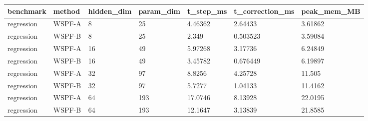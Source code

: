 \begin{tabular}{lllllll}
\hline
benchmark & method & hidden\_dim & param\_dim & t\_step\_ms & t\_correction\_ms & peak\_mem\_MB \\
\hline
regression & WSPF-A & 8 & 25 & 4.46362 & 2.64433 & 3.61862 \\
regression & WSPF-B & 8 & 25 & 2.349 & 0.503523 & 3.59084 \\
regression & WSPF-A & 16 & 49 & 5.97268 & 3.17736 & 6.24849 \\
regression & WSPF-B & 16 & 49 & 3.45782 & 0.676449 & 6.19897 \\
regression & WSPF-A & 32 & 97 & 8.8256 & 4.25728 & 11.505 \\
regression & WSPF-B & 32 & 97 & 5.7277 & 1.04133 & 11.4162 \\
regression & WSPF-A & 64 & 193 & 17.0746 & 8.13928 & 22.0195 \\
regression & WSPF-B & 64 & 193 & 12.1647 & 3.13839 & 21.8585 \\
\hline
\end{tabular}
